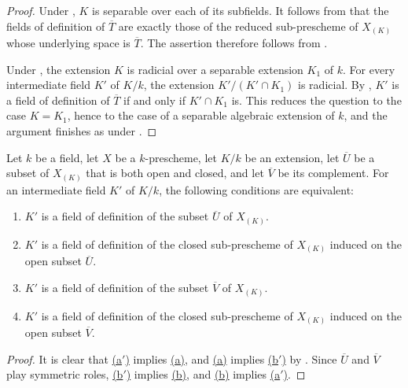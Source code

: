 \begin{proof}
Under , $K$ is separable over each of its
subfields.
It follows from  that the fields of definition of
$\overline T$ are exactly those of the reduced sub-prescheme of
$X_{(K)}$ whose underlying space is $\overline T$.
The assertion therefore follows from .

Under , the extension $K$ is radicial over a
separable extension $K_1$ of $k$.
For every intermediate field $K'$ of $K/k$, the extension
$K'/(K'\cap K_1)$ is radicial.
By , $K'$ is a field of definition of
$\overline T$ if and only if $K'\cap K_1$ is.
This reduces the question to the case $K=K_1$, hence to the case of
a separable algebraic extension of $k$, and the argument finishes as
under .
\end{proof}

\begin{proposition}[4.9.6]
\label{IV.4.9.6}
Let $k$ be a field, let $X$ be a $k$-prescheme, let $K/k$ be an
extension, let $\overline U$ be a subset of $X_{(K)}$ that is both
open and closed, and let $\overline V$ be its complement.
For an intermediate field $K'$ of $K/k$, the following conditions
are equivalent:
\begin{enumerate}
\item[\rm(a)]
\label{IV.4.9.6.a}
$K'$ is a field of definition of the subset $\overline U$ of
$X_{(K)}$.
\item[\rm(a$'$)]
\label{IV.4.9.6.aprime}
$K'$ is a field of definition of the closed sub-prescheme of
$X_{(K)}$ induced on the open subset $\overline U$.
\item[\rm(b)]
\label{IV.4.9.6.b}
$K'$ is a field of definition of the subset $\overline V$ of
$X_{(K)}$.
\item[\rm(b$'$)]
\label{IV.4.9.6.bprime}
$K'$ is a field of definition of the closed sub-prescheme of
$X_{(K)}$ induced on the open subset $\overline V$.
\end{enumerate}
\end{proposition}

\begin{proof}
It is clear that
{\hyperref[IV.4.9.6.aprime]{(a$'$)}} implies
{\hyperref[IV.4.9.6.a]{(a)}}, and
{\hyperref[IV.4.9.6.a]{(a)}} implies
{\hyperref[IV.4.9.6.bprime]{(b$'$)}} by .
Since $\overline U$ and $\overline V$ play symmetric roles,
{\hyperref[IV.4.9.6.bprime]{(b$'$)}} implies
{\hyperref[IV.4.9.6.b]{(b)}}, and
{\hyperref[IV.4.9.6.b]{(b)}} implies
{\hyperref[IV.4.9.6.aprime]{(a$'$)}}.
\end{proof}

